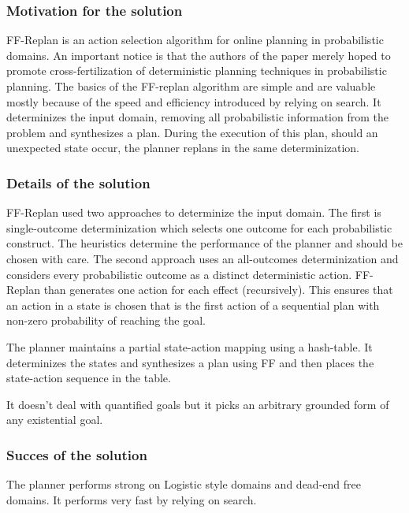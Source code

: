 \documentclass[runningheads,a4paper]{llncs}
\begin{document}
\subsubsection{Motivation for the solution}
FF-Replan is an action selection algorithm for online planning in probabilistic domains. An important notice is that the authors of the paper merely hoped to promote cross-fertilization of deterministic planning techniques in probabilistic planning. The basics of the FF-replan algorithm are simple and are valuable mostly because of the speed and efficiency introduced by relying on search.  It determinizes the input domain, removing all probabilistic information from the problem and synthesizes a plan. During the execution of this plan, should an unexpected state occur, the planner replans in the same determinization.

\subsubsection{Details of the solution}
FF-Replan used two approaches to determinize the input domain. The first is single-outcome determinization which selects one outcome for each probabilistic construct. The heuristics determine the performance of the planner and should be chosen with care. The second approach uses an all-outcomes determinization and considers every probabilistic outcome as a distinct deterministic action. FF-Replan than generates one action for each effect (recursively). This ensures that an action in a state is chosen that is the first action of a sequential plan with non-zero probability of reaching the goal.

The planner maintains a partial state-action mapping using a hash-table. It determinizes the states and synthesizes a plan using FF and then places the state-action sequence in the table.

It doesn't deal with quantified goals but it picks an arbitrary grounded form of any existential goal.

\subsubsection{Succes of the solution}
The planner performs strong on Logistic style domains and dead-end free domains. It performs very fast by relying on search.
\end{document}
